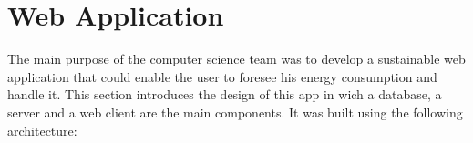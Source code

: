 %
%
\section{Web Application}

The main purpose of the computer science team was to develop a sustainable web application that could enable the user to foresee his energy consumption and handle it.  This section introduces the design of this app in wich a database, a server and a web client are the main components. It was built using the following architecture:

    \begin{figure}[!h] %
        \centering
    \end{figure}
% 






